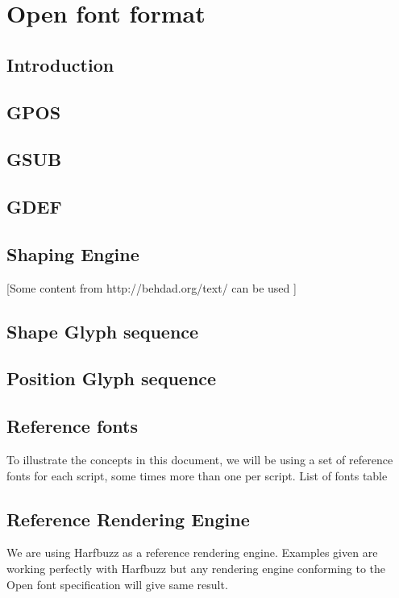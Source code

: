 \chapter{Open font format}

\section{Introduction}

\section{GPOS}

\section{GSUB}

\section{GDEF}

\section{Shaping Engine}

[Some content from http://behdad.org/text/ can be used ]
\section{Shape Glyph sequence}

\section{Position Glyph sequence}

\section{Reference fonts}

To illustrate the concepts in this document, we will be using a set of reference
fonts for each script, some times more than one per script.
List of fonts table

\section{Reference Rendering Engine}

We are using Harfbuzz as  a reference rendering engine. Examples given are
working perfectly with Harfbuzz but any rendering engine conforming to the Open
font specification will give same result.
